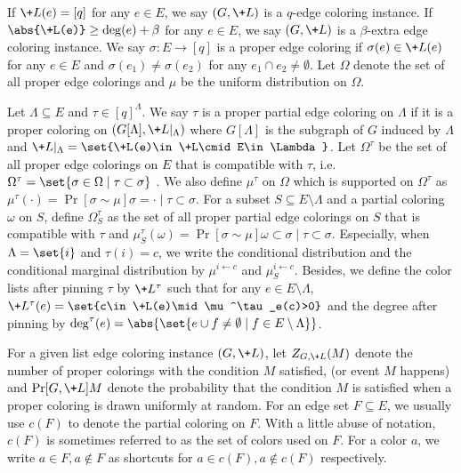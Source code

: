 If $\+L(e)=[q]$ for any $e\in E$, we say $(G,\+L)$ is a $q$-edge coloring instance.  If $\abs{\+L(e)}\geq \deg(e)+\beta$ for any $e\in E$, we say $(G,\+L)$ is a $\beta$-extra edge coloring instance. We say $\sigma:E\rightarrow [q]$ is a proper edge coloring if $\sigma(e) \in \+L(e)$ for any $e\in E$ and $\sigma(e_1)\neq \sigma(e_2)$ for any $e_1\cap e_2 \neq \emptyset$. Let $\Omega$ denote the set of all proper edge colorings and $\mu$ be the uniform distribution on $\Omega$. 

Let $\Lambda\subseteq E$ and $\tau\in [q]^\Lambda$. We say $\tau$ is a proper partial edge coloring on $\Lambda$ if it is a proper coloring on $(G[\Lambda],\+L|_\Lambda)$ where $G[\Lambda]$ is the subgraph of $G$ induced by $\Lambda$ and $\+L|_{\Lambda}=\set{\+L(e)\in \+L\cmid E\in \Lambda}$. Let $\Omega^\tau$ be the set of all proper edge colorings on $E$ that is compatible with $\tau$, i.e. $\Omega^\tau = \set{\sigma \in \Omega\mid \tau \subset \sigma}$ . We also define $\mu^\tau$ on $\Omega$ which is supported on $\Omega^\tau$ as $\mu^\tau(\cdot) = \Pr[\sigma \sim \mu]{\sigma=\cdot \mid \tau \subset \sigma}$.
For a subset $S\subseteq E\setminus \Lambda$ and a partial coloring $\omega$ on $S$, define $\Omega^\tau_S$ as the set of all proper partial edge colorings on $S$ that is compatible with
$\tau$ and $\mu^\tau_S(\omega)=\Pr[\sigma\sim \mu]{\omega \subset \sigma \mid \tau \subset \sigma}$. Especially, when $\Lambda=\set{i}$ and $\tau(i)=c$, we write the conditional distribution and the conditional marginal distribution by $\mu^{i\leftarrow c}$ and $\mu^{i\leftarrow c}_S$. Besides, we define the color lists after pinning  $\tau$ by $\+L^\tau$ such that for any $e\in E\setminus\Lambda$, $\+L^\tau(e)=\set{c\in \+L(e)\mid \mu^\tau_e(c)>0}$ and the degree after pinning by $\deg^\tau(e) = \abs{\set{e\cup f \neq \emptyset\mid f \in E\setminus \Lambda}}$.%

For a given list edge coloring instance $(G,\+L)$, let $Z_{G,\+L}(M)$ denote the number of proper colorings with the condition $M$ satisfied, (or event $M$ happens) and $\Pr[G,\+L]{M}$ denote the probability that the condition $M$ is satisfied when a proper coloring is drawn uniformly at random. For an edge set $F\subseteq E$, we usually use $c(F)$ to denote the partial coloring on $F$. With a little abuse of notation, $c(F)$ is sometimes referred to as the set of colors used on $F$.
For a color $a$, we write $a\in F, a\notin F$ as shortcuts for $a\in c(F), a\notin c(F)$ respectively.

